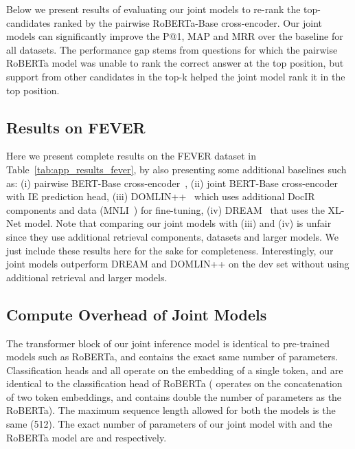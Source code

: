Below we present results of evaluating our joint models to re-rank the top- candidates ranked by the pairwise RoBERTa-Base cross-encoder. Our joint models can significantly improve the P@1, MAP and MRR over the baseline for all datasets. The performance gap stems from questions for which the pairwise RoBERTa model was unable to rank the correct answer at the top position, but support from other candidates in the top-k helped the joint model rank it in the top position.


\subsection{Results on FEVER}
Here we present complete results on the FEVER dataset in Table~\ref{tab:app_results_fever}, by also presenting some additional baselines such as: (i) pairwise BERT-Base cross-encoder~\cite{tymoshenko-moschitti-2021-strong}, (ii) joint BERT-Base cross-encoder with IE prediction head, (iii) DOMLIN++~\cite{Stammbach2020eFEVEREA} which uses additional DocIR components and data (MNLI~\cite{williams-etal-2018-broad}) for fine-tuning, (iv) DREAM~\cite{zhong-etal-2020-reasoning} that uses the XL-Net model. Note that comparing our joint models with (iii) and (iv) is unfair since they use additional retrieval components, datasets and larger models. We just include these results here for the sake for completeness. Interestingly, our joint models outperform DREAM and DOMLIN++ on the dev set without using additional retrieval and larger models. 

\subsection{Compute Overhead of Joint Models}
\label{app:number_params}

The transformer block of our joint inference model is identical to pre-trained models such as RoBERTa, and contains the exact same number of parameters. Classification heads  and  all operate on the embedding of a single token, and are identical to the classification head of RoBERTa ( operates on the concatenation of two token embeddings, and contains double the number of parameters as the RoBERTa). The maximum sequence length allowed for both the models is the same (512). The exact number of parameters of our joint model with  and the RoBERTa model are  and  respectively.

